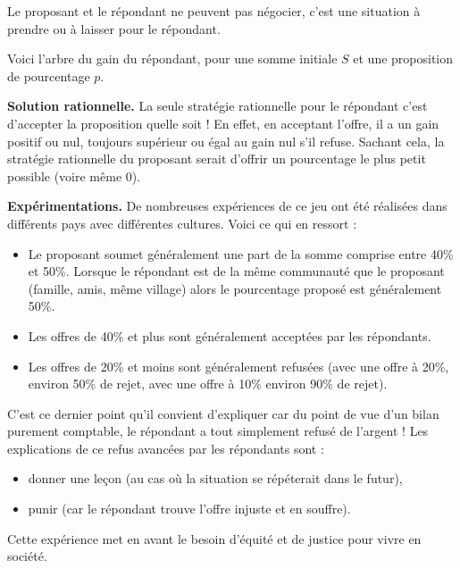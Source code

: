 \documentclass[11pt,class=report,crop=false]{standalone}
\begin{document}
Le proposant et le répondant ne peuvent pas négocier, c'est une situation \og{}à prendre ou à laisser\fg{} pour le répondant.

Voici l'arbre du gain du répondant, pour une somme initiale $S$ et une proposition de pourcentage $p$.


\medskip

\textbf{Solution rationnelle.}
La seule stratégie rationnelle pour le répondant c'est d'accepter la proposition quelle soit ! En effet, en acceptant l'offre, il a un gain positif ou nul, toujours supérieur ou égal au gain nul s'il refuse.
Sachant cela, la stratégie rationnelle du proposant serait d'offrir un pourcentage le plus petit possible (voire même $0$).

\medskip

\textbf{Expérimentations.}
De nombreuses expériences de ce jeu ont été réalisées dans différents pays avec différentes cultures. Voici ce qui en ressort :
\begin{itemize}
	\item Le proposant soumet généralement une part de la somme comprise entre 40\% et 50\%. Lorsque le répondant est de la même communauté que le proposant (famille, amis, même village) alors le pourcentage proposé est généralement 50\%.
	
	\item Les offres de 40\% et plus sont généralement acceptées par les répondants.

	\item Les offres de 20\% et moins sont généralement refusées (avec une offre à 20\%, environ 50\% de rejet, avec une offre à 10\% environ 90\% de rejet).
\end{itemize} 

C'est ce dernier point qu'il convient d'expliquer car du point de vue d'un bilan purement comptable, le répondant a tout simplement refusé de l'argent !
Les explications de ce refus avancées par les répondants sont :
\begin{itemize}
	\item donner une leçon (au cas où la situation se répéterait dans le futur),
	\item punir (car le répondant trouve l'offre injuste et en souffre).
\end{itemize}

Cette expérience met en avant le besoin d'équité et de justice pour vivre en société.
\end{document}
